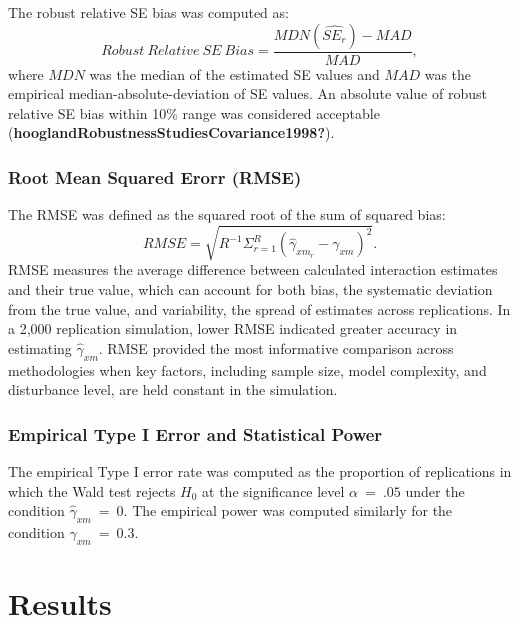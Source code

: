 \documentclass[
  man]{apa6}
\begin{document}
The robust relative SE bias was computed as:
\begin{equation}
Robust\ Relative\ SE\ Bias = \frac{MDN(\widehat{SE_{r}}) - MAD}{MAD},
\end{equation}
where \(MDN\) was the median of the estimated SE values and \(MAD\) was the empirical median-absolute-deviation of SE values. An absolute value of robust relative SE bias within 10\% range was considered acceptable (\textbf{hooglandRobustnessStudiesCovariance1998?}).

\subsubsection{Root Mean Squared Erorr (RMSE)}\label{root-mean-squared-erorr-rmse}

The RMSE was defined as the squared root of the sum of squared bias:
\begin{equation}
RMSE = \sqrt{R^{-1}\Sigma^{R}_{r = 1}(\hat{\gamma}_{xm_{r}} - \gamma_{xm})^2}.
\end{equation}
RMSE measures the average difference between calculated interaction estimates and their true value, which can account for both bias, the systematic deviation from the true value, and variability, the spread of estimates across replications. In a 2,000 replication simulation, lower RMSE indicated greater accuracy in estimating \(\hat{\gamma}_{xm}\). RMSE provided the most informative comparison across methodologies when key factors, including sample size, model complexity, and disturbance level, are held constant in the simulation.

\subsubsection{Empirical Type I Error and Statistical Power}\label{empirical-type-i-error-and-statistical-power}

The empirical Type I error rate was computed as the proportion of replications in which the Wald test rejects \(H_{0}\) at the significance level \(\alpha \ = \ .05\) under the condition \(\hat{\gamma}_{xm} \ = \ 0\). The empirical power was computed similarly for the condition \(\gamma_{xm} \ = \ 0.3\).

\section{Results}\label{results}
\end{document}
